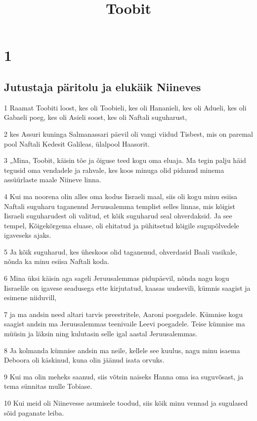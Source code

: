 

\title{Toobit}

\chapter{1}

\section*{Jutustaja päritolu ja elukäik Niineves}

\par 1 Raamat Toobiti loost, kes oli Toobieli, kes oli Hananieli, kes oli Adueli, kes oli Gabaeli poeg, kes oli Asieli soost, kes oli Naftali suguharust,
\par 2 kes Assuri kuninga Salmanassari päevil oli vangi viidud Tisbest, mis on paremal pool Naftali Kedesit Galileas, ülalpool Haasorit.
\par 3 „Mina, Toobit, käisin tõe ja õiguse teed kogu oma eluaja. Ma tegin palju häid tegusid oma vendadele ja rahvale, kes koos minuga olid pidanud minema assüürlaste maale Niineve linna.
\par 4 Kui ma noorena olin alles oma kodus Iisraeli maal, siis oli kogu minu esiisa Naftali suguharu taganenud Jeruusalemma templist selles linnas, mis kõigist Iisraeli suguharudest oli valitud, et kõik suguharud seal ohverdaksid. Ja see tempel, Kõigekõrgema eluase, oli ehitatud ja pühitsetud kõigile sugupõlvedele igaveseks ajaks.
\par 5 Ja kõik suguharud, kes üheskoos olid taganenud, ohverdasid Baali vasikale, nõnda ka minu esiisa Naftali koda.
\par 6 Mina üksi käisin aga sageli Jeruusalemmas pidupäevil, nõnda nagu kogu Iisraelile on igavese seadusega ette kirjutatud, kaasas uudsevili, kümnis saagist ja esimene niiduvill,
\par 7 ja ma andsin need altari tarvis preestritele, Aaroni poegadele. Kümnise kogu saagist andsin ma Jeruusalemmas teenivaile Leevi poegadele. Teise kümnise ma müüsin ja läksin ning kulutasin selle igal aastal Jeruusalemmas.
\par 8 Ja kolmanda kümnise andsin ma neile, kellele see kuulus, nagu minu isaema Deboora oli käskinud, kuna olin jäänud isata orvuks.
\par 9 Kui ma olin meheks saanud, siis võtsin naiseks Hanna oma isa suguvõsast, ja tema sünnitas mulle Tobiase.
\par 10 Kui meid oli Niinevesse asumisele toodud, siis kõik minu vennad ja sugulased sõid paganate leiba.
